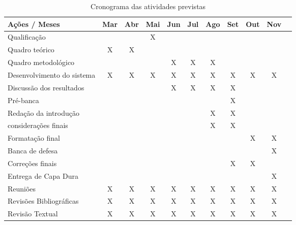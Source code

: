 \begin{table}[!htpb]
\centering

\begin{small} 
  
\setlength{\tabcolsep}{8pt} 


\begin{tabular}{|l|c|c|c|c|c|c|c|c|c|c|}\hline

\textbf{Ações / Meses}& Mar & Abr & Mai & Jun & Jul & Ago & Set & Out & Nov 
\\
\hline

Qualificação & &  & X &  &  &  &  &  &    \\ \hline

Quadro teórico & X & X &  &  &  &  &  &  &    \\ \hline

Quadro metodológico & &  &  & X & X & X &  &  &    \\ \hline

Desenvolvimento do sistema & X & X & X & X & X & X & X & X & X   \\ \hline

Discussão dos resultados & &  &  & X & X & X & X &  &    \\\hline

Pré-banca & &  &  &  &  &  & X &  &    \\ \hline

Redação da introdução & &  &  &  &  & X & X & &  \\\hline 

considerações finais & &  &  &  &  & X & X & &  \\\hline

Formatação final & &  &  &  &  &  &  & X & X   \\ \hline

Banca de defesa & &  &  &  &  &  &  &  & X   \\ \hline

Correções finais & &  &  &  &  &  & X & X &    \\ \hline

Entrega de Capa Dura & &  &  &  &  &  &  &  & X   \\ \hline

Reuniões & X & X & X & X & X & X & X & X & X   \\ \hline

Revisões Bibliográficas & X & X & X & X & X & X & X & X & X   \\ \hline

Revisão Textual & X & X & X & X & X & X & X & X & X   \\ \hline


\end{tabular} 
\end{small}
\caption{Cronograma das atividades previstas}
\label{t_cronograma}
\end{table} 


